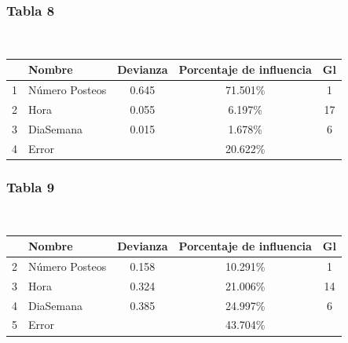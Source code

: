 \documentclass[a4paper,10pt]{article}
\begin{document}
\subsubsection{Tabla 8}

\begin{center}
  \\[0.3cm]
  \begin{tabular}{l|l|c|c|c}
    & Nombre & Devianza & Porcentaje de influencia & Gl \\
    \hline
    1 & Número Posteos & 0.645 & 71.501\% & 1 \\
    2 & Hora & 0.055 & 6.197\% & 17 \\
    3 & DiaSemana & 0.015 & 1.678\% & 6 \\
    4 & Error &  & 20.622\% &  \\
    \hline
  \end{tabular}
\end{center}

\subsubsection{Tabla 9}

\begin{center}
 \\[0.3cm]
  \begin{tabular}{l|l|c|c|c}
    & Nombre & Devianza & Porcentaje de influencia & Gl \\
    \hline
    2 & Número Posteos & 0.158 & 10.291\% & 1 \\
    3 & Hora & 0.324 & 21.006\% & 14 \\
    4 & DiaSemana & 0.385 & 24.997\% & 6 \\
    5 & Error &  & 43.704\% &  \\
    \hline
  \end{tabular} 
\end{center}

 
\end{document}
